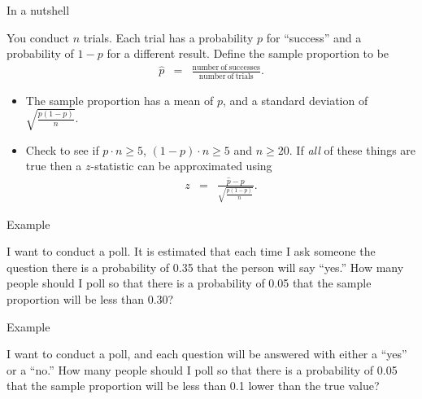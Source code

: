 \begin{frame}{In a nutshell}


  You conduct $n$ trials. Each trial has a probability $p$ for
  ``success'' and a probability of $1-p$ for a different
  result. Define the sample proportion to be 
  \begin{eqnarray*}
    \hat{p} & = & \frac{\mathrm{number~of~successes}}{\mathrm{number~of~trials}}.
  \end{eqnarray*}

  \begin{itemize}
  \item The sample proportion has a mean of $p$, and a standard
    deviation of $\sqrt{\frac{p(1-p)}{n}}$.
  \item Check to see if $p\cdot n \geq 5$, $(1-p)\cdot n \geq 5$ and
    $n\geq 20$. If \textit{all} of these things are true then a
    $z$-statistic can be approximated using
    \begin{eqnarray*}
      z & = & \frac{\hat{p}-p}{\sqrt{\frac{p(1-p)}{n}}}.
    \end{eqnarray*}


  \end{itemize}



  
\end{frame}

\begin{frame}{Example}

  I want to conduct a poll. It is estimated that each time I ask
  someone the question there is a probability of 0.35 that the person
  will say ``yes.'' How many people should I poll so that there is a
  probability of 0.05 that the sample proportion will be less than
  0.30?

  \vfill


\end{frame}

\begin{frame}{Example}

  I want to conduct a poll, and each question will be answered with
  either a ``yes'' or a ``no.''  How many people should I poll so that
  there is a probability of 0.05 that the sample proportion will be
  less than 0.1 lower than the true value?

  \vfill


\end{frame}



